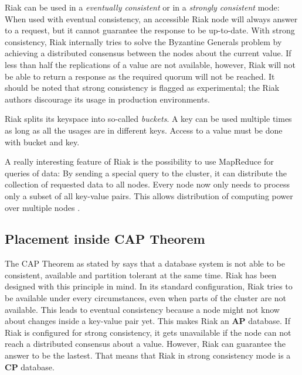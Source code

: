 Riak can be used in a {\itshape eventually consistent} or in a {\itshape strongly consistent} mode: When used with eventual consistency, an accessible Riak node will always answer to a request, but it cannot guarantee the response to be up-to-date. With strong consistency, Riak internally tries to solve the Byzantine Generals problem by achieving a distributed consensus between the nodes about the current value. If less than half the replications of a value are not available, however, Riak will not be able to return a response as the required quorum will not be reached. It should be noted that strong consistency is flagged as experimental; the Riak authors discourage its usage in production environments. \parencite{RiakStrongConsistency}

Riak splits its keyspace into so-called {\itshape buckets}. A key can be used multiple times as long as all the usages are in different keys. Access to a value must be done with bucket and key.

A really interesting feature of Riak is the possibility to use MapReduce for queries of data: By sending a special query to the cluster, it can distribute the collection of requested data to all nodes. Every node now only needs to process only a subset of all key-value pairs. This allows distribution of computing power over multiple nodes \parencite{RiakUsingMapReduce}.

\subsection{Placement inside CAP Theorem}
The CAP Theorem as stated by \textcite{Brewer1999} says that a database system is not able to be consistent, available and partition tolerant at the same time. Riak has been designed with this principle in mind. In its standard configuration, Riak tries to be available under every circumstances, even when parts of the cluster are not available. This leads to eventual consistency because a node might not know about changes inside a key-value pair yet. This makes Riak an \textbf{AP} database. If Riak is configured for strong consistency, it gets unavailable if the node can not reach a distributed consensus about a value. However, Riak can guarantee the answer to be the lastest. That means that Riak in strong consistency mode is a \textbf{CP} database.

